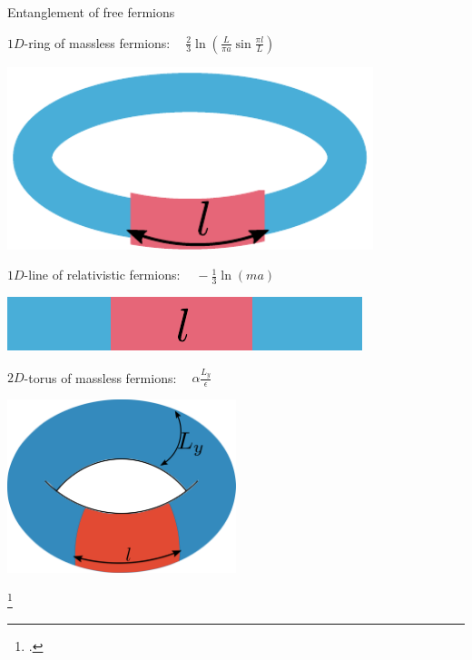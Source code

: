 \documentclass[11pt,aspectratio=169]{beamer}
\begin{document}
\begin{frame}{Entanglement of free fermions}
	\begin{minipage}{0.6\textwidth}
		\vspace{15pt}
	\(1D\)-ring of massless fermions: \(~ ~ ~ ~ \frac{2}{3} \ln \left( \frac{L}{\pi a} \sin \frac{\pi l}{L}\right) \)
		\vspace{15pt}
	\end{minipage}
	\begin{minipage}{0.39\textwidth}
		\centering
		\includegraphics[width=0.8\textwidth]{figures/ring.pdf}
	\end{minipage}

	\begin{minipage}{0.6\textwidth}
		\vspace{15pt}
	\(1D\)-line of relativistic fermions: \(~ ~ ~ ~ -\frac{1}{3} \ln \left( m a\right) \)
		\vspace{15pt}
	\end{minipage}
	\begin{minipage}{0.39\textwidth}
		\centering
		\includegraphics[width=\textwidth]{figures/open.pdf}
	\end{minipage}

	\begin{minipage}{0.6\textwidth}
	\vspace{15pt}
	\(2D\)-torus of massless fermions: \(~ ~ ~ ~ \alpha \frac{L_y}{\epsilon} \)\\
	\end{minipage}
	\begin{minipage}{0.39\textwidth}
		\centering
		\includegraphics[width=0.5\textwidth]{figures/torus-EE.pdf}
	\end{minipage}
	\footcite{calabrese2004}
\end{frame}
\end{document}
